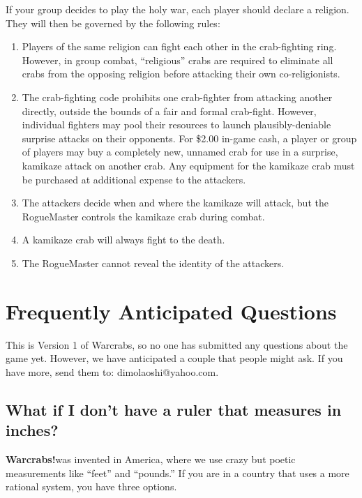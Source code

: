 \documentclass[a4paper,10pt]{article}
\newcommand{\warcrabs}{\textbf{Warcrabs!}}
\begin{document}
If your group decides to play the holy war, each player should declare a religion. They will then be governed by the following rules:

\begin{enumerate}
 \item Players of the same religion can fight each other in the crab-fighting ring. However, in group combat, ``religious'' crabs are required to eliminate all crabs from the opposing religion before attacking their own co-religionists.
 \item The crab-fighting code prohibits one crab-fighter from attacking another directly, outside the bounds of a fair and formal crab-fight. However, individual fighters may pool their resources to launch plausibly-deniable surprise attacks on their opponents. For \$2.00 in-game cash, a player or group of players may buy a completely new, unnamed crab for use in a surprise, kamikaze attack on another crab. Any equipment for the kamikaze crab must be purchased at additional expense to the attackers.
 \item The attackers decide when and where the kamikaze will attack, but the RogueMaster controls the kamikaze crab during combat.
 \item A kamikaze crab will always fight to the death.
 \item The RogueMaster cannot reveal the identity of the attackers.
\end{enumerate}

\pagebreak

\section*{Frequently Anticipated Questions}
\label{sec:FrequentlyAnticipatedQuestions}

This is Version 1 of Warcrabs, so no one has submitted any questions about the game yet. However, we have anticipated a couple that people might ask. If you have more, send them to: dimolaoshi@yahoo.com.

\subsection*{What if I don't have a ruler that measures in inches?}
\label{sec:Faq1}

\warcrabs\hspace*{4pt}was invented in America, where we use crazy but poetic measurements like ``feet'' and ``pounds.'' If you are in a country that uses a more rational system, you have three options.
\end{document}
